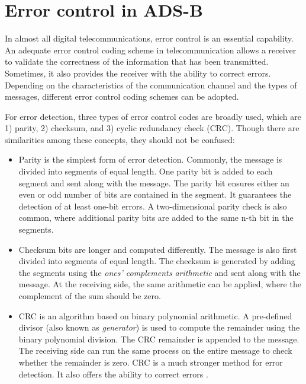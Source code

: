 \chapter{Error control in ADS-B} \label{chap:adsb_parity}

In almost all digital telecommunications, error control is an essential capability. An adequate error control coding scheme in telecommunication allows a receiver to validate the correctness of the information that has been transmitted. Sometimes, it also provides the receiver with the ability to correct errors. Depending on the characteristics of the communication channel and the types of messages, different error control coding schemes can be adopted.

For error detection, three types of error control codes are broadly used, which are 1) parity, 2) checksum, and 3) cyclic redundancy check (CRC)\cite{grami2015}. Though there are similarities among these concepts, they should not be confused:

\begin{itemize}

 \item Parity is the simplest form of error detection. Commonly, the message is divided into segments of equal length. One parity bit is added to each segment and sent along with the message. The parity bit ensures either an even or odd number of \1 bits are contained in the segment. It guarantees the detection of at least one-bit errors. A two-dimensional parity check is also common, where additional parity bits are added to the same n-th bit in the segments.

 \item Checksum bits are longer and computed differently. The message is also first divided into segments of equal length. The checksum is generated by adding the segments using the \emph{ones' complements arithmetic} and sent along with the message. At the receiving side, the same arithmetic can be applied, where the complement of the sum should be zero.

 \item CRC is an algorithm based on binary polynomial arithmetic. A pre-defined divisor (also known as \emph{generator}) is used to compute the remainder using the binary polynomial division. The CRC remainder is appended to the message. The receiving side can run the same process on the entire message to check whether the remainder is zero. CRC is a much stronger method for error detection. It also offers the ability to correct errors \cite{mandel2009}.

\end{itemize}

